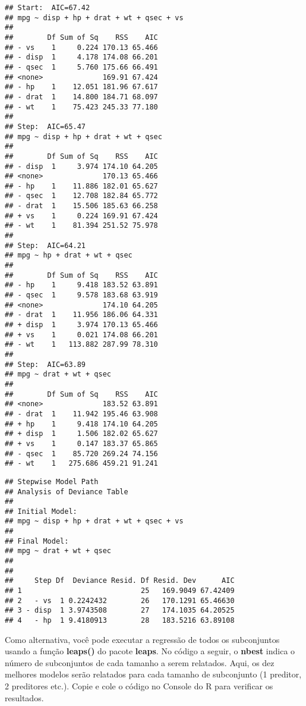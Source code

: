 \documentclass[]{article}
\newenvironment{Shaded}{\begin{snugshade}}{\end{snugshade}}
\newcommand{\CommentTok}[1]{\textcolor[rgb]{0.56,0.35,0.01}{\textit{#1}}}
\newcommand{\NormalTok}[1]{#1}
\newcommand{\OperatorTok}[1]{\textcolor[rgb]{0.81,0.36,0.00}{\textbf{#1}}}
\begin{document}
\begin{verbatim}
## Start:  AIC=67.42
## mpg ~ disp + hp + drat + wt + qsec + vs
## 
##        Df Sum of Sq    RSS    AIC
## - vs    1     0.224 170.13 65.466
## - disp  1     4.178 174.08 66.201
## - qsec  1     5.760 175.66 66.491
## <none>              169.91 67.424
## - hp    1    12.051 181.96 67.617
## - drat  1    14.800 184.71 68.097
## - wt    1    75.423 245.33 77.180
## 
## Step:  AIC=65.47
## mpg ~ disp + hp + drat + wt + qsec
## 
##        Df Sum of Sq    RSS    AIC
## - disp  1     3.974 174.10 64.205
## <none>              170.13 65.466
## - hp    1    11.886 182.01 65.627
## - qsec  1    12.708 182.84 65.772
## - drat  1    15.506 185.63 66.258
## + vs    1     0.224 169.91 67.424
## - wt    1    81.394 251.52 75.978
## 
## Step:  AIC=64.21
## mpg ~ hp + drat + wt + qsec
## 
##        Df Sum of Sq    RSS    AIC
## - hp    1     9.418 183.52 63.891
## - qsec  1     9.578 183.68 63.919
## <none>              174.10 64.205
## - drat  1    11.956 186.06 64.331
## + disp  1     3.974 170.13 65.466
## + vs    1     0.021 174.08 66.201
## - wt    1   113.882 287.99 78.310
## 
## Step:  AIC=63.89
## mpg ~ drat + wt + qsec
## 
##        Df Sum of Sq    RSS    AIC
## <none>              183.52 63.891
## - drat  1    11.942 195.46 63.908
## + hp    1     9.418 174.10 64.205
## + disp  1     1.506 182.02 65.627
## + vs    1     0.147 183.37 65.865
## - qsec  1    85.720 269.24 74.156
## - wt    1   275.686 459.21 91.241
\end{verbatim}

\begin{Shaded}
\end{Shaded}

\begin{verbatim}
## Stepwise Model Path 
## Analysis of Deviance Table
## 
## Initial Model:
## mpg ~ disp + hp + drat + wt + qsec + vs
## 
## Final Model:
## mpg ~ drat + wt + qsec
## 
## 
##     Step Df  Deviance Resid. Df Resid. Dev      AIC
## 1                            25   169.9049 67.42409
## 2   - vs  1 0.2242432        26   170.1291 65.46630
## 3 - disp  1 3.9743508        27   174.1035 64.20525
## 4   - hp  1 9.4180913        28   183.5216 63.89108
\end{verbatim}

Como alternativa, você pode executar a regressão de todos os
subconjuntos usando a função \textbf{leaps()} do pacote \textbf{leaps}.
No código a seguir, o \textbf{nbest} indica o número de subconjuntos de
cada tamanho a serem relatados. Aqui, os dez melhores modelos serão
relatados para cada tamanho de subconjunto (1 preditor, 2 preditores
etc.). Copie e cole o código no Console do R para verificar os
resultados.
\end{document}
